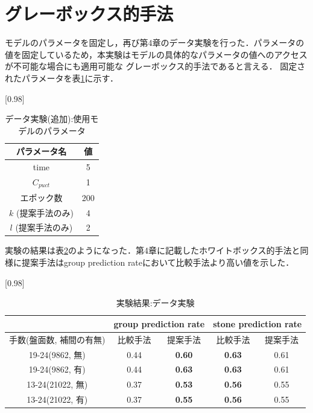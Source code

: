 \section{グレーボックス的手法}
\label{sec:gray}
モデルのパラメータを固定し，再び第4章のデータ実験を行った．パラメータの値を固定しているため，本実験はモデルの具体的なパラメータの値へのアクセスが不可能な場合にも適用可能な
グレーボックス的手法であると言える．
固定されたパラメータを表\ref{table:param-data-extra}に示す．
\begin{table}[H]
	\caption{データ実験(追加):使用モデルのパラメータ}
	\centering
	\scalebox{0.98}[0.98]{
		\begin{tabular}{c|c}
			パラメータ名 & 値 \\ \hline
			time    & 5 \\ 
			$C_{puct}$    & 1 \\
			エポック数 & 200 \\
			$k$ (提案手法のみ)     & 4 \\
			$l$ (提案手法のみ)     & 2 \\
		\end{tabular}
	}
	\label{table:param-data-extra}
\end{table}

実験の結果は表\ref{table:result-offline}のようになった．第4章に記載したホワイトボックス的手法と同様に提案手法はgroup prediction rateにおいて比較手法より高い値を示した．
\begin{table}[H]
	\caption{実験結果:データ実験}
	\centering
	\scalebox{0.98}[0.98]{
		\begin{tabular}{c|c|c|c|c}
			\multicolumn{1}{c}{} & \multicolumn{2}{|c|}{group prediction rate} 
			& \multicolumn{2}{c|}{stone prediction rate}\\ \hline \hline
			手数(盤面数, 補間の有無)  & 比較手法  & 提案手法 & 比較手法 & 提案手法  \\ \hline
			19-24(9862, 無) & 0.44& \bf{0.60} & \bf{0.63}& 0.61  \\
			19-24(9862, 有)  & 0.44   & \bf{0.63}& \bf{0.63} & 0.61   \\
			13-24(21022, 無)   & 0.37  & \bf{0.53}& \bf{0.56} & 0.55  \\
			13-24(21022, 有)   & 0.37 & \bf{0.55}& \bf{0.56} & 0.55   \\
		\end{tabular}
	}
	\label{table:result-offline}
\end{table}
